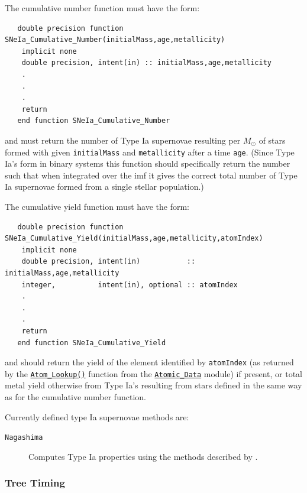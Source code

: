 The cumulative number function must have the form:
\begin{verbatim}
   double precision function SNeIa_Cumulative_Number(initialMass,age,metallicity)
    implicit none
    double precision, intent(in) :: initialMass,age,metallicity
    .
    .
    .
    return
   end function SNeIa_Cumulative_Number 
\end{verbatim}
and must return the number of Type Ia supernovae resulting per $M_\odot$ of stars formed with given {\tt initialMass} and {\tt metallicity} after a time {\tt age}. (Since Type Ia's form in binary systems this function should specifically return the number such that when integrated over the \gls{imf} it gives the correct total number of Type Ia supernovae formed from a single stellar population.)

The cumulative yield function must have the form:
\begin{verbatim}
   double precision function SNeIa_Cumulative_Yield(initialMass,age,metallicity,atomIndex)
    implicit none
    double precision, intent(in)           :: initialMass,age,metallicity
    integer,          intent(in), optional :: atomIndex
    .
    .
    .
    return
   end function SNeIa_Cumulative_Yield 
\end{verbatim}
and should return the yield of the element identified by {\tt atomIndex} (as returned by the \hyperlink{atomic.data.F90:atomic_data:atom_lookup}{{\tt Atom\_Lookup()}} function from the \hyperlink{atomic.data.F90:atomic_data}{{\tt Atomic\_Data}} module) if present, or total metal yield otherwise from Type Ia's resulting from stars defined in the same way as for the cumulative number function.

Currently defined type Ia supernovae methods are:
\begin{description}
 \item [{\tt Nagashima}] Computes Type Ia properties using the methods described by \cite{nagashima_metal_2005}.
\end{description}

\subsubsection{Tree Timing}

